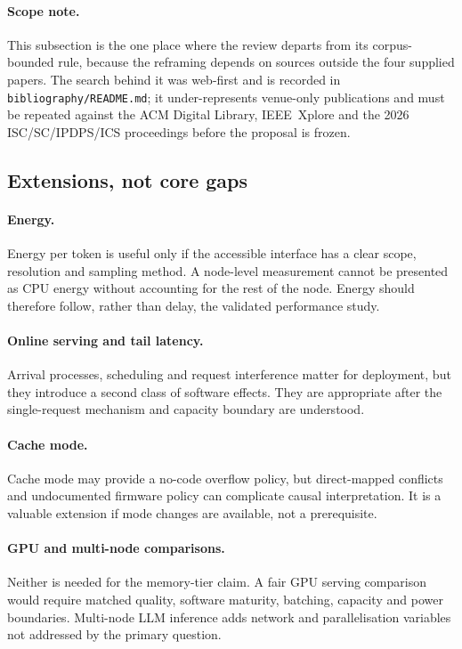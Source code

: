 \paragraph{Scope note.}
This subsection is the one place where the review departs from its
corpus-bounded rule, because the reframing depends on sources outside
the four supplied papers.  The search behind it was web-first and is
recorded in \texttt{bibliography/README.md}; it under-represents
venue-only publications and must be repeated against the ACM Digital
Library, IEEE~Xplore and the 2026 ISC/SC/IPDPS/ICS proceedings before
the proposal is frozen.

\subsection{Extensions, not core gaps}

\paragraph{Energy.}
Energy per token is useful only if the accessible interface has a clear
scope, resolution and sampling method.  A node-level measurement cannot
be presented as CPU energy without accounting for the rest of the node.
Energy should therefore follow, rather than delay, the validated
performance study.

\paragraph{Online serving and tail latency.}
Arrival processes, scheduling and request interference matter for
deployment, but they introduce a second class of software effects.
They are appropriate after the single-request mechanism and capacity
boundary are understood.

\paragraph{Cache mode.}
Cache mode may provide a no-code overflow policy, but direct-mapped
conflicts and undocumented firmware policy can complicate causal
interpretation.  It is a valuable extension if mode changes are
available, not a prerequisite.

\paragraph{GPU and multi-node comparisons.}
Neither is needed for the memory-tier claim.  A fair GPU serving
comparison would require matched quality, software maturity, batching,
capacity and power boundaries.  Multi-node LLM inference adds network
and parallelisation variables not addressed by the primary question.

